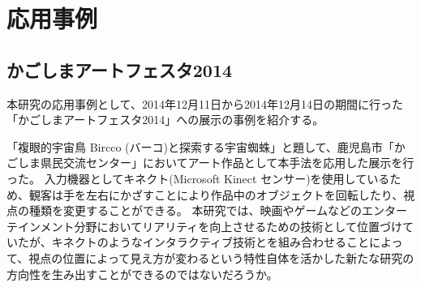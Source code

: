 \chapter*{応用事例}
\section{かごしまアートフェスタ2014}
\label{SKagoshima}

本研究の応用事例として、2014年12月11日から2014年12月14日の期間に行った「かごしまアートフェスタ2014」への展示の事例を紹介する。

「複眼的宇宙鳥 Bircco (バーコ)と探索する宇宙蜘蛛」と題して、鹿児島市「かごしま県民交流センター」においてアート作品として本手法を応用した展示を行った。
入力機器としてキネクト(Microsoft Kinect センサー)を使用しているため、観客は手を左右にかざすことにより作品中のオブジェクトを回転したり、視点の種類を変更することができる。
本研究では、映画やゲームなどのエンターテインメント分野においてリアリティを向上させるための技術として位置づけていたが、キネクトのようなインタラクティブ技術とを組み合わせることによって、視点の位置によって見え方が変わるという特性自体を活かした新たな研究の方向性を生み出すことができるのではないだろうか。




